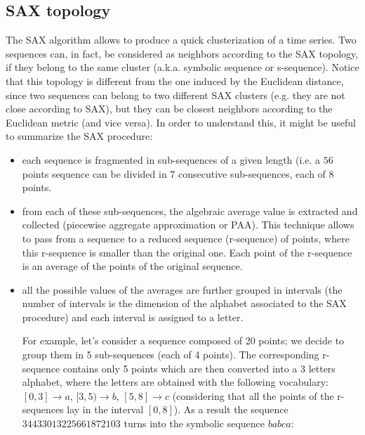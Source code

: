\documentclass[a4paper,twoside]{article}
\begin{document}
\subsection{SAX topology}\label{ssec:saxTopology}
The SAX algorithm \cite{sax} allows to produce a quick clusterization of a time series.
Two sequences can, in fact, be considered as neighbors according to the SAX topology, if they belong to the same cluster (a.k.a. symbolic sequence or s-sequence). 
%
%
Notice that this topology is different from the one induced by the Euclidean distance, since two sequences can belong to two different SAX clusters (e.g. they are not close according to SAX), but they can be closest neighbors according to the Euclidean metric (and vice versa).
%
In order to understand this, it might be useful to summarize the SAX procedure:
\begin{itemize}
 \item each sequence is fragmented in sub-sequences of a given length (i.e. a $56$ points sequence can be divided in $7$ consecutive sub-sequences, each of $8$ points.
 \item from each of these sub-sequences, the algebraic average value is extracted and collected (piecewise aggregate approximation or PAA). This technique allows to pass from a sequence to a reduced sequence (r-sequence) of points, where this r-sequence is smaller than the original one. Each point of the r-sequence is an average of the points of the original sequence.
 \item all the possible values of the averages are further grouped in intervals (the number of intervals is the dimension of the alphabet associated to the SAX procedure) and each interval is assigned to a letter. 
  
For example, let's consider a sequence composed of 20 points; we decide to group them in 5 sub-sequences (each of 4 points). The corresponding  r-sequence contains only 5 points which are then converted into a 3 letters alphabet, where the letters are obtained with the following vocabulary: $[0,3]\rightarrow a$,  $[3,5)\rightarrow b$,   $[5,8]\rightarrow c$ (considering that all the points of the r-sequences lay in the interval $[0,8]$). As a result the sequence $34433013225661872103$ turns into the symbolic sequence $babca$:
\end{itemize}
\end{document}
